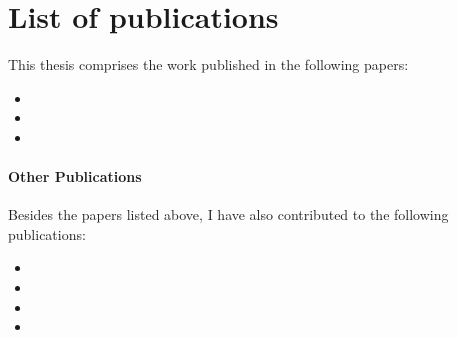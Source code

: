 \section{List of publications\label{sec:publications}} This thesis comprises the work published in
the following papers:

\begin{itemize}
      \item {}
      \item {}
      \item {}
\end{itemize}

\paragraph{Other Publications} Besides the papers listed above, I have also contributed to the
following publications:

\begin{itemize}
      \item {}
      \item {}
      \item {}
      \item {}
\end{itemize}